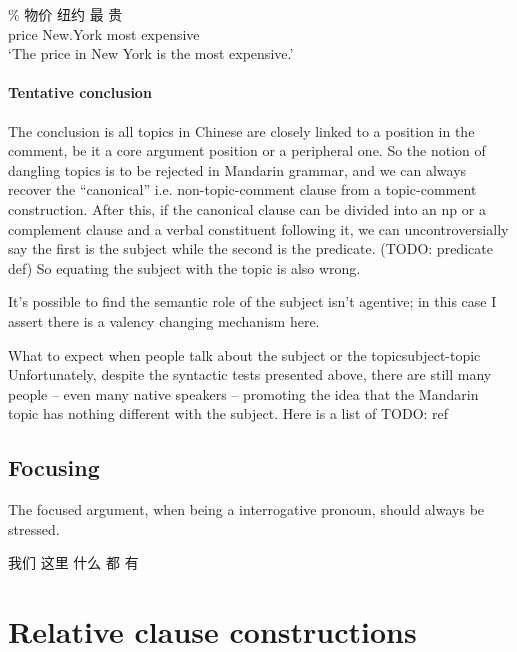 \documentclass[UTF8, a4paper, oneside, scheme=plain, 12pt]{ctexrep}
\newcommand{\translate}[1]{`#1'}
\begin{document}
\begin{exe}
    \ex \gll \% 物价 纽约 最 贵  \\
    {} price New.York most expensive \\
    \glt \translate{The price in New York is the most expensive.}
\end{exe}

\subsubsection{Tentative conclusion}

The conclusion is all topics in Chinese are closely linked to a position in the comment,
be it a core argument position or a peripheral one.
So the notion of dangling topics is to be rejected in Mandarin grammar,
and we can always recover the ``canonical'' i.e. non-topic-comment clause
from a topic-comment construction.
After this, if the canonical clause can be divided into an \acs{np}
or a complement clause and a verbal constituent following it,
we can uncontroversially say the first is the subject while the second is the predicate. (TODO: predicate def)
So equating the subject with the topic is also wrong.

It's possible to find the semantic role of the subject isn't agentive;
in this case I assert there is a valency changing mechanism here.

\begin{infobox}{What to expect when people talk about the subject or the topic}{subject-topic}
    Unfortunately, despite the syntactic tests presented above,
    there are still many people -- even many native speakers -- 
    promoting the idea that the Mandarin topic has nothing different with the subject.
    Here is a list of TODO: ref
\end{infobox}

\section{Focusing}

The focused argument, when being a interrogative pronoun, 
should always be stressed. 

\begin{exe}
    \ex 我们 这里 什么 都 有
\end{exe}

\chapter{Relative clause constructions}
\end{document}
